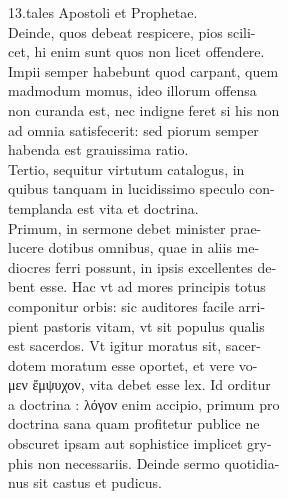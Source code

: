 \documentclass{article}
\begin{document}
\begin{pages}
                13.tales Apostoli et Prophetae. \\
                Deinde, quos debeat respicere, pios scili- \\
                cet, hi enim sunt quos non licet offendere. \\
                Impii semper habebunt quod carpant, quem \\
                madmodum momus, ideo illorum offensa \\
                non curanda est, nec indigne feret si his non \\
                ad omnia satisfecerit: sed piorum semper \\
                habenda est grauissima ratio. \\
                Tertio, sequitur virtutum catalogus, in \\
                quibus tanquam in lucidissimo speculo con- \\
                templanda est vita et doctrina. \\
                Primum, in sermone debet minister prae- \\
                lucere dotibus omnibus, quae in aliis me- \\
                diocres ferri possunt, in ipsis excellentes de- \\
                bent esse. Hac vt ad mores principis totus \\
                componitur orbis: sic auditores facile arri- \\
                pient pastoris vitam, vt sit populus qualis \\
                est sacerdos. Vt igitur moratus sit, sacer- \\
                dotem moratum esse oportet, et vere vo- \\
                μεν ἔμψυχον, vita debet esse lex. Id orditur \\
                a doctrina : λόγον enim accipio, primum pro \\
                doctrina sana quam profitetur publice ne \\
                obscuret ipsam aut sophistice implicet gry- \\
                phis non necessariis. Deinde sermo quotidia- \\
                nus sit castus et pudicus. \\

\end{pages}
\end{document}
